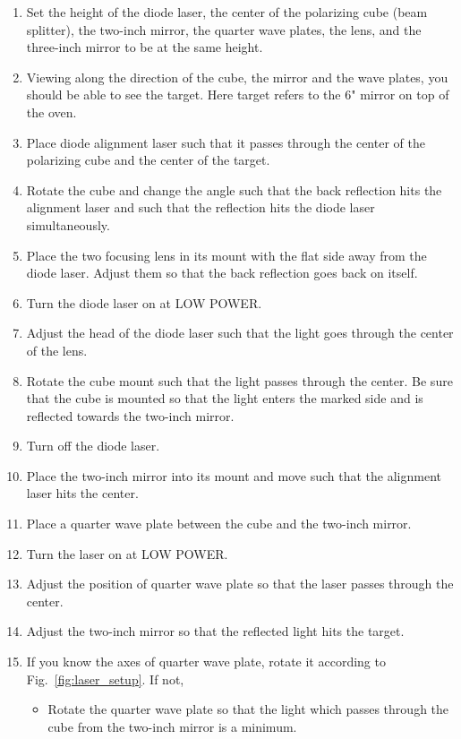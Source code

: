 {\begin{enumerate} \setlength{\parskip}{0ex}
\item Set the height of the diode laser, the center of the polarizing
  cube (beam splitter), the two-inch mirror, the quarter wave plates, 
  the lens, and the three-inch mirror to be at the same height.
\item Viewing along the direction of the cube, the mirror and the wave 
  plates, you should be able to see the target.  Here target refers to
  the 6" mirror on top of the oven.  
 \item Place diode alignment laser such that it passes through the center
  of the polarizing cube and the center of the target.
\item Rotate the cube and change the angle such that the back reflection
  hits the alignment laser and such that the reflection hits the diode
  laser simultaneously.
\item Place the two focusing lens in its mount with the flat side away
  from the diode laser. Adjust them so that the back reflection goes back 
  on itself.
\item Turn the diode laser on at LOW POWER.
\item Adjust the head of the diode laser such that the light goes
  through the center of the lens.
\item Rotate the cube mount such that the light passes through the
  center. Be sure that the cube is mounted so that the light enters 
  the marked side and is reflected towards the two-inch mirror.
\item Turn off the diode laser.
\item Place the two-inch mirror into its mount and move such that the
  alignment laser hits the center.
\item Place a quarter wave plate between the cube and the two-inch
  mirror.
\item Turn the laser on at LOW POWER.
\item Adjust the position of quarter wave plate so that the laser passes through the
  center.
\item Adjust the two-inch mirror so that the reflected light hits 
  the target.
\item If you know the axes of quarter wave plate, rotate it according to 
      Fig.~\ref{fig:laser_setup}.  If not, 
\begin{itemize}
\item Rotate the quarter wave plate so that the light which passes
  through the cube from the two-inch mirror is a minimum.

\end{itemize}
\end{enumerate}}
